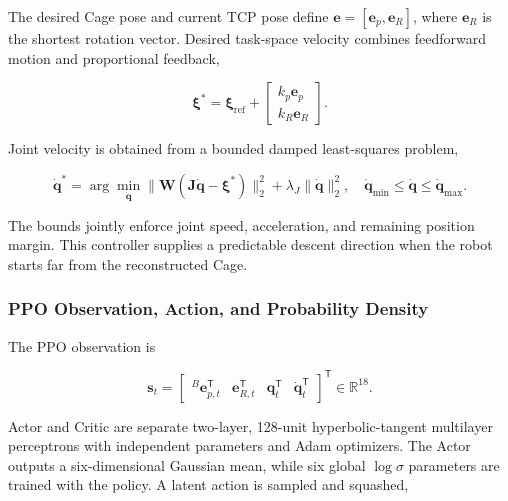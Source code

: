 \documentclass[conference]{IEEEtran}
\begin{document}
The desired Cage pose and current TCP pose define \(\mathbf{e}=[\mathbf{e}_p,\mathbf{e}_R]\), where \(\mathbf{e}_R\) is the shortest rotation vector. Desired task-space velocity combines feedforward motion and proportional feedback,

\begin{equation}
\boldsymbol{\xi}^{*}=\boldsymbol{\xi}_{\mathrm{ref}}+
\begin{bmatrix}k_p\mathbf{e}_p\\k_R\mathbf{e}_R\end{bmatrix}.

\end{equation}

Joint velocity is obtained from a bounded damped least-squares problem,

\begin{equation}
\dot{\mathbf{q}}^{*}=\arg\min_{\dot{\mathbf{q}}}
\|\mathbf{W}(\mathbf{J}\dot{\mathbf{q}}-\boldsymbol{\xi}^{*})\|_2^2
+\lambda_J\|\dot{\mathbf{q}}\|_2^2,
\quad
\dot{\mathbf{q}}_{\min}\leq\dot{\mathbf{q}}\leq\dot{\mathbf{q}}_{\max}.

\end{equation}

The bounds jointly enforce joint speed, acceleration, and remaining position margin. This controller supplies a predictable descent direction when the robot starts far from the reconstructed Cage.

\subsubsection{PPO Observation, Action, and Probability Density}

The PPO observation is

\begin{equation}
\mathbf{s}_t=
\begin{bmatrix}
{}^{B}\mathbf{e}_{p,t}^{\mathsf T}&
\mathbf{e}_{R,t}^{\mathsf T}&
\mathbf{q}_t^{\mathsf T}&
\dot{\mathbf{q}}_t^{\mathsf T}
\end{bmatrix}^{\mathsf T}\in\mathbb{R}^{18}.

\end{equation}

Actor and Critic are separate two-layer, 128-unit hyperbolic-tangent multilayer perceptrons with independent parameters and Adam optimizers. The Actor outputs a six-dimensional Gaussian mean, while six global \(\log\sigma\) parameters are trained with the policy. A latent action is sampled and squashed,
\end{document}
